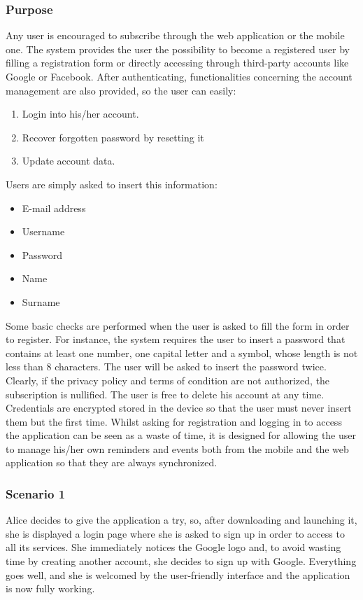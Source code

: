 \subsubsection{Purpose}
Any user is encouraged to subscribe through the web application or the mobile one. The system provides the user the possibility to become a registered user by filling a registration form or directly accessing through third-party accounts like Google or Facebook. After authenticating, functionalities concerning the account management are also provided, so the user can easily:
\begin{enumerate}
	\item Login into his/her account.
    \item Recover forgotten password by resetting it
    \item Update account data.
\end{enumerate}
Users are simply asked to insert this information:
\begin{itemize}
	\item E-mail address
	\item Username
	\item Password
    \item Name
    \item Surname

\end{itemize}
Some basic checks are performed when the user is asked to fill the form in order to register. For instance, the system requires the user to insert a password that contains at least one number, one capital letter and a symbol, whose length is not less than 8 characters. The user will be asked to insert the password twice. Clearly, if the privacy policy and terms of condition are not authorized, the subscription is nullified. The user is free to delete his account at any time. Credentials are encrypted stored in the device so that the user must never insert them but the first time. Whilst asking for registration and logging in to access the application can be seen as a waste of time, it is designed for allowing the user to manage his/her own reminders and events both from the mobile and the web application so that they are always synchronized.
\subsubsection{Scenario 1}
Alice decides to give the application a try, so, after downloading and launching it, she is displayed a login page where she is asked to sign up in order to access to all its services. She immediately notices the Google logo and, to avoid wasting time by creating another account, she decides to sign up with Google. Everything goes well, and she is welcomed by the user-friendly interface and the application is now fully working.
